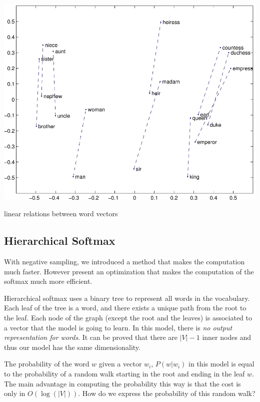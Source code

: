 \documentclass[nobib]{tufte-handout}
\begin{document}
\begin{marginfigure}%
  \includegraphics[width=\linewidth]{manwoman}
  \caption{linear relations between word vectors}
  \label{fig:manwoman}
\end{marginfigure}


\subsection{Hierarchical Softmax}

With negative sampling, we introduced a method that makes the computation much faster. However \cite{DBLP:journals/corr/abs-1301-3781} present an optimization that makes the computation of the softmax much more efficient. 

Hierarchical softmax uses a binary tree to represent all words in the vocabulary. Each leaf of the tree is a word, and there exists a unique path from the root to the leaf. Each node of the graph (except the root and the leaves) is associated to a vector that the model is going to learn. In this model, there is \emph{no output representation for words}. It can be proved that there are $ |V| - 1 $ inner nodes and thus our model has the same dimensionality. 


The probability of the word $ w $ given a vector $ w_i $, $ P(w | w_i) $ in this model is equal to the probability of a random walk starting in the root and ending in the leaf $ w $. The main advantage in computing the probability this way is that the cost is only in $ O(\log(|V|))$. How do we express the probability of this random walk?
\end{document}
